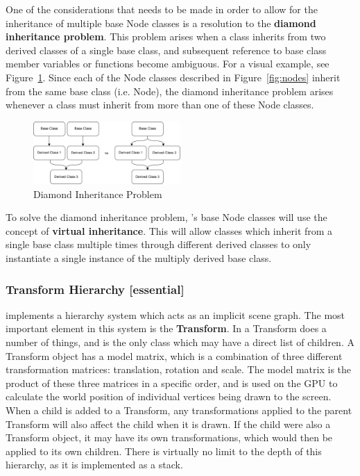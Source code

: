 \documentclass{GlobalDocument}
\begin{document}
One of the considerations that needs to be made in order to allow for the inheritance of multiple base Node classes is a resolution to the \textbf{diamond inheritance problem}. This problem arises when a class inherits from two derived classes of a single base class, and subsequent reference to base class member variables or functions become ambiguous. For a visual example, see Figure~\ref{fig:diamond_problem}. Since each of the Node classes described in Figure~\ref{fig:nodes} inherit from the same base class (i.e. Node), the diamond inheritance problem arises whenever a class must inherit from more than one of these Node classes.

\begin{figure}[htb]
\centering\includegraphics[width=0.5\textwidth]{images/diamond_inheritance}
\caption{Diamond Inheritance Problem}
\label{fig:diamond_problem}
\end{figure}

To solve the diamond inheritance problem, \ourengine{}'s base Node classes will use the concept of \textbf{virtual inheritance}. This will allow classes which inherit from a single base class multiple times through different derived classes to only instantiate a single instance of the multiply derived base class.

\subsubsection{Transform Hierarchy [essential]}
\ourengine{} implements a hierarchy system which acts as an implicit scene graph. The most important element in this system is the \textbf{Transform}. In \ourengine{} a Transform does a number of things, and is the only class which may have a direct list of children. A Transform object has a model matrix, which is a combination of three different transformation matrices: translation, rotation and scale. The model matrix is the product of these three matrices in a specific order, and is used on the GPU to calculate the world position of individual vertices being drawn to the screen. When a child is added to a Transform, any transformations applied to the parent Transform will also affect the child when it is drawn. If the child were also a Transform object, it may have its own transformations, which would then be applied to its own children. There is virtually no limit to the depth of this hierarchy, as it is implemented as a stack.
\end{document}
